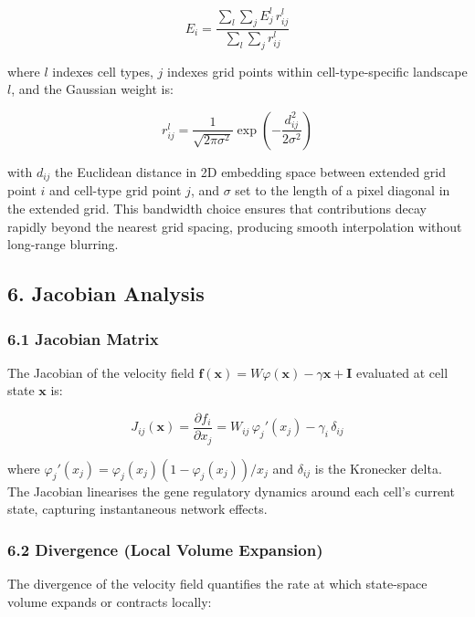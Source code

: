 \documentclass[11pt]{article}
\begin{document}
\begin{equation}
E_i = \frac{\displaystyle\sum_l \sum_j E_j^l\,r_{ij}^l}{\displaystyle\sum_l \sum_j r_{ij}^l} 
\end{equation}


where $l$ indexes cell types, $j$ indexes grid points within cell-type-specific landscape $l$, and the Gaussian weight is:


\begin{equation}
r_{ij}^l = \frac{1}{\sqrt{2\pi\sigma^2}}\exp\!\left(-\frac{d_{ij}^2}{2\sigma^2}\right) 
\end{equation}


with $d_{ij}$ the Euclidean distance in 2D embedding space between extended grid point $i$ and cell-type grid point $j$, and $\sigma$ set to the length of a pixel diagonal in the extended grid. This bandwidth choice ensures that contributions decay rapidly beyond the nearest grid spacing, producing smooth interpolation without long-range blurring.



\subsection*{6. Jacobian Analysis}


\subsubsection*{6.1 Jacobian Matrix}

The Jacobian of the velocity field $\mathbf{f}(\mathbf{x}) = W\varphi(\mathbf{x}) - \gamma\mathbf{x} + \mathbf{I}$ evaluated at cell state $\mathbf{x}$ is:


\begin{equation}
J_{ij}(\mathbf{x}) = \frac{\partial f_i}{\partial x_j} = W_{ij}\,\varphi_j'(x_j) - \gamma_i\,\delta_{ij} 
\end{equation}


where $\varphi_j'(x_j) = \varphi_j(x_j)\left(1 - \varphi_j(x_j)\right)/x_j$ and $\delta_{ij}$ is the Kronecker delta. The Jacobian linearises the gene regulatory dynamics around each cell's current state, capturing instantaneous network effects.


\subsubsection*{6.2 Divergence (Local Volume Expansion)}

The divergence of the velocity field quantifies the rate at which state-space volume expands or contracts locally:
\end{document}
